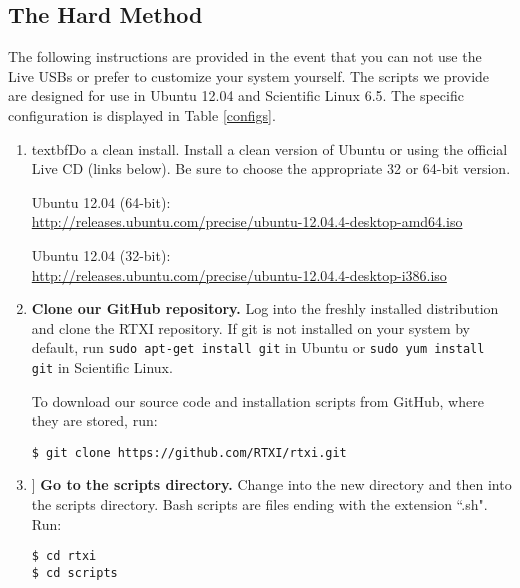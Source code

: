\subsection{The Hard Method}
\label{manualinstall} 

The following instructions are provided in the event that you can not use the Live USBs or prefer to customize your system yourself. The scripts we provide are designed for use in Ubuntu 12.04 and Scientific Linux 6.5. The specific configuration is displayed in Table \ref{configs}.


\begin{enumerate}
\item textbf{Do a clean install.} Install a clean version of Ubuntu or using the official Live CD (links below). Be sure to choose the appropriate 32 or 64-bit version.

Ubuntu 12.04 (64-bit):\\
\url{http://releases.ubuntu.com/precise/ubuntu-12.04.4-desktop-amd64.iso}

Ubuntu 12.04 (32-bit):\\
\url{http://releases.ubuntu.com/precise/ubuntu-12.04.4-desktop-i386.iso}

\item \textbf{Clone our GitHub repository.} Log into the freshly installed distribution and clone the RTXI repository. If git is not installed on your system by default, run \texttt{sudo apt-get install git} in Ubuntu or \texttt{sudo yum install git} in Scientific Linux.

To download our source code and installation scripts from GitHub, where they are stored, run:

\begin{verbatim}
$ git clone https://github.com/RTXI/rtxi.git
\end{verbatim}

\item ] \textbf{Go to the scripts directory.} Change into the new directory and then into the scripts directory. Bash scripts are files ending with the extension ``.sh". Run:

\begin{verbatim}
$ cd rtxi
$ cd scripts
\end{verbatim}


\end{enumerate}
